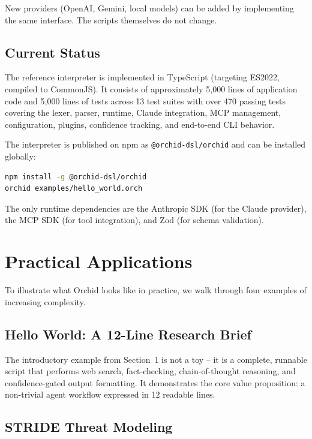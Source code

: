 \documentclass[11pt,a4paper]{article}
\begin{document}
New providers (OpenAI, Gemini, local models) can be added by implementing the same interface. The scripts themselves do not change.

\subsection{Current Status}

The reference interpreter is implemented in TypeScript (targeting ES2022, compiled to CommonJS). It consists of approximately 5,000 lines of application code and 5,000 lines of tests across 13 test suites with over 470 passing tests covering the lexer, parser, runtime, Claude integration, MCP management, configuration, plugins, confidence tracking, and end-to-end CLI behavior.

The interpreter is published on npm as \texttt{@orchid-dsl/orchid} and can be installed globally:

\begin{lstlisting}[language=bash]
npm install -g @orchid-dsl/orchid
orchid examples/hello_world.orch
\end{lstlisting}

The only runtime dependencies are the Anthropic SDK (for the Claude provider), the MCP SDK (for tool integration), and Zod (for schema validation).

\section{Practical Applications}

To illustrate what Orchid looks like in practice, we walk through four examples of increasing complexity.

\subsection{Hello World: A 12-Line Research Brief}

The introductory example from Section~1 is not a toy -- it is a complete, runnable script that performs web search, fact-checking, chain-of-thought reasoning, and confidence-gated output formatting. It demonstrates the core value proposition: a non-trivial agent workflow expressed in 12 readable lines.

\subsection{STRIDE Threat Modeling}
\end{document}
